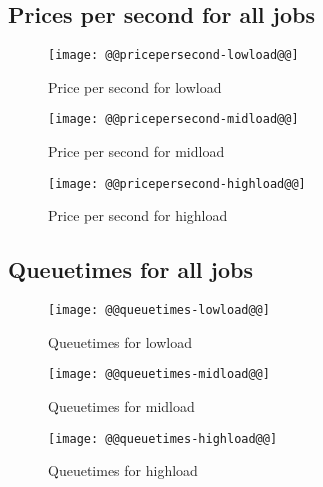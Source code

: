 \documentclass[11pt]{article}
\begin{document}
\newpage
\subsection{Prices per second for all jobs}
\begin{figure}[htbp]
  \begin{center}
    \texttt{[image: @@pricepersecond-lowload@@]}
    \caption{Price per second for lowload}
    \label{fig:pricepersecond-lowload}
  \end{center}
\end{figure}
\begin{figure}[htbp]
  \begin{center}
    \texttt{[image: @@pricepersecond-midload@@]}
    \caption{Price per second for midload}
    \label{fig:pricepersecond-midload}
  \end{center}
\end{figure}
\begin{figure}[htbp]
  \begin{center}
    \texttt{[image: @@pricepersecond-highload@@]}
    \caption{Price per second for highload}
    \label{fig:pricepersecond-highload}
  \end{center}
\end{figure}


\newpage
\subsection{Queuetimes for all jobs}
\begin{figure}[htbp]
  \begin{center}
    \texttt{[image: @@queuetimes-lowload@@]}
    \caption{Queuetimes for lowload}
    \label{fig:queuetimes-lowload}
  \end{center}
\end{figure}
\begin{figure}[htbp]
  \begin{center}
    \texttt{[image: @@queuetimes-midload@@]}
    \caption{Queuetimes for midload}
    \label{fig:queuetimes-midload}
  \end{center}
\end{figure}
\begin{figure}[htbp]
  \begin{center}
    \texttt{[image: @@queuetimes-highload@@]}
    \caption{Queuetimes for highload}
    \label{fig:queuetimes-highload}
  \end{center}
\end{figure}
\end{document}
